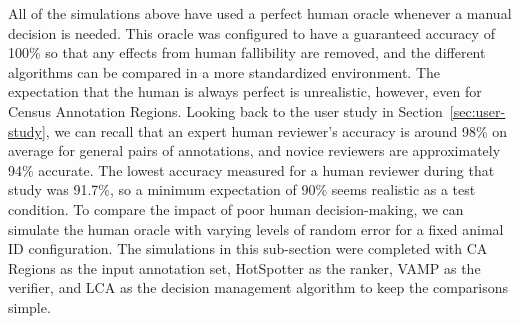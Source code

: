 All of the simulations above have used a perfect human oracle whenever a manual decision is needed.  This oracle was configured to have a guaranteed accuracy of 100\% so that any effects from human fallibility are removed, and the different algorithms can be compared in a more standardized environment.  The expectation that the human is always perfect is unrealistic, however, even for Census Annotation Regions.  Looking back to the user study in Section~\ref{sec:user-study}, we can recall that an expert human reviewer's accuracy is around 98\% on average for general pairs of annotations, and novice reviewers are approximately 94\% accurate.  The lowest accuracy measured for a human reviewer during that study was 91.7\%, so a minimum expectation of 90\% seems realistic as a test condition.  To compare the impact of poor human decision-making, we can simulate the human oracle with varying levels of random error for a fixed animal ID configuration.  The simulations in this sub-section were completed with CA Regions as the input annotation set, HotSpotter as the ranker, VAMP as the verifier, and LCA as the decision management algorithm to keep the comparisons simple.


